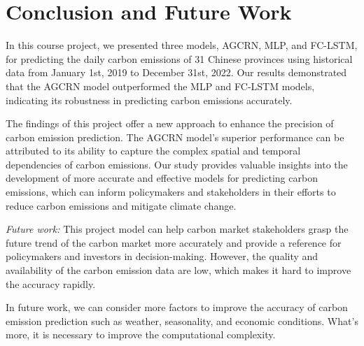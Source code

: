 \documentclass[sigconf, authordraft]{acmart}
\begin{document}
\section{Conclusion and Future Work}


In this course project, we presented three models, AGCRN, MLP, and FC-LSTM, for
predicting the daily carbon emissions of 31 Chinese provinces using historical
data from January 1st, 2019 to December 31st, 2022. Our results demonstrated that
the AGCRN model outperformed the MLP and FC-LSTM models, indicating its
robustness in predicting carbon emissions accurately.

The findings of this project offer a new approach to enhance the precision of
carbon emission prediction. The AGCRN model's superior performance can be attributed
to its ability to capture the complex spatial and temporal dependencies of carbon
emissions. Our study provides valuable insights into the development of more
accurate and effective models for predicting carbon emissions, which can inform
policymakers and stakeholders in their efforts to reduce carbon emissions and mitigate
climate change.

\emph{Future work:} This project model can help carbon market stakeholders grasp
the future trend of the carbon market more accurately and provide a reference for
policymakers and investors in decision-making. However, the quality and availability
of the carbon emission data are low, which makes it hard to improve the
accuracy rapidly.

In future work, we can consider more factors to improve the accuracy of carbon
emission prediction such as weather, seasonality, and economic conditions.
What’s more, it is necessary to improve the computational complexity.






\appendix
\end{document}
